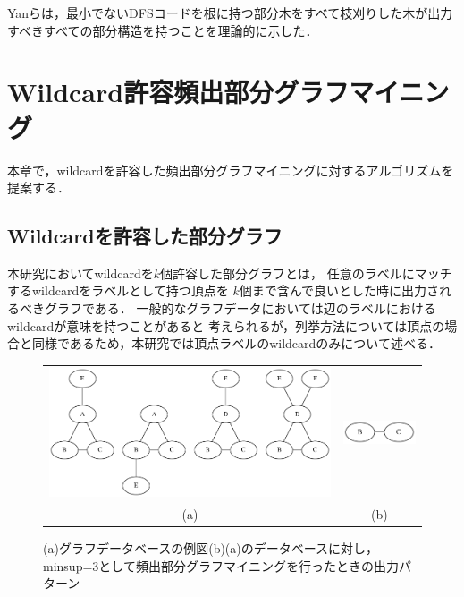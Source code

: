 \documentclass[12pt,fleqn]{jsotsuron}
\begin{document}
Yanらは，最小でないDFSコードを根に持つ部分木をすべて枝刈りした木が出力すべきすべての部分構造を持つことを理論的に示した\cite{gSpan}．

\chapter{Wildcard許容頻出部分グラフマイニング}

本章で，wildcardを許容した頻出部分グラフマイニングに対するアルゴリズムを提案する．

\section{Wildcardを許容した部分グラフ}
本研究においてwildcardを$k$個許容した部分グラフとは，
任意のラベルにマッチするwildcardをラベルとして持つ頂点を
$k$個まで含んで良いとした時に出力されるべきグラフである．
一般的なグラフデータにおいては辺のラベルにおけるwildcardが意味を持つことがあると
考えられるが，列挙方法については頂点の場合と同様であるため，本研究では頂点ラベルのwildcardのみについて述べる．
\begin{figure}[t]
    \begin{tabular}{cc}
        \begin{minipage}{0.5\hsize}
        \begin{center}

            \includegraphics[width=10cm,bb=0 0 755 347]{fig/gggg.png}
        \end{center}
        \end{minipage}

        &    
        \begin{minipage}{0.5\hsize}
        \begin{center}
            \includegraphics[width=25mm,bb=0 0 179 59]{fig/g.png}
        \end{center}
        \end{minipage}\\
        (a)&(b)\\
    \end{tabular}
    \label{fig:one}
    \caption{(a)グラフデータベースの例図(b)(a)のデータベースに対し，minsup=3として頻出部分グラフマイニングを行ったときの出力パターン}
\end{figure}
\end{document}
